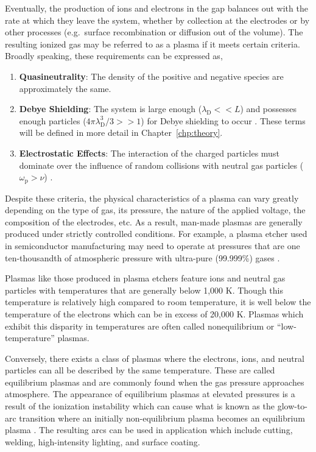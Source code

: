 Eventually, the production of ions and electrons in the gap balances out with
the rate at which they leave the system, whether by collection at the electrodes
or by other processes (e.g.\ surface recombination or diffusion out of the
volume). The resulting ionized gas may be referred to as a plasma if it meets
certain criteria. Broadly speaking, these requirements can be expressed as,
\begin{enumerate}
  \item \textbf{Quasineutrality}: The density of the positive and negative
species are approximately the same.
  \item \textbf{Debye Shielding}: The system is large enough ($\lambda_\mathrm{D} 
<< L$) and possesses enough particles ($4\pi\lambda_\mathrm{D}^3/3 >> 1$) for
Debye shielding to occur \cite{Chen1984}. These terms will be defined in more
detail in Chapter~\ref{chp:theory}.
  \item \textbf{Electrostatic Effects}: The interaction of the charged particles
must dominate over the influence of random collisions with neutral gas particles
($\omega_\mathrm{p} > \nu$) \cite{Chen1984}.
\end{enumerate}

Despite these criteria, the physical characteristics of a plasma can vary
greatly depending on the type of gas, its pressure, the nature of the applied
voltage, the composition of the electrodes, etc. As a result, man-made plasmas
are generally produced under strictly controlled conditions. For example, a
plasma etcher used in semiconductor manufacturing may need to operate at
pressures that are one ten-thousandth of atmospheric pressure with ultra-pure
(99.999\%) gases \cite{Greenberg1993a}.

Plasmas like those produced in plasma etchers feature ions and neutral gas
particles with temperatures that are generally below 1,000 K. Though this
temperature is relatively high compared to room temperature, it is well below
the temperature of the electrons which can be in excess of 20,000 K. Plasmas
which exhibit this disparity in temperatures are often called nonequilibrium or
``low-temperature'' plasmas.

Conversely, there exists a class of plasmas where the electrons, ions, and
neutral particles can all be described by the same temperature. These are called
equilibrium plasmas and are commonly found when the gas pressure approaches
atmosphere. The appearance of equilibrium plasmas at elevated pressures is a
result of the ionization instability which can cause what is known as the
glow-to-arc transition where an initially non-equilibrium plasma becomes an
equilibrium plasma \cite{Kunhardt2000}. The resulting arcs can be used in
application which include cutting, welding, high-intensity lighting, and surface
coating.

